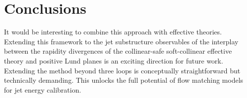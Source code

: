 \section{Conclusions}\label{sec:conclusions}

It would be interesting to combine this approach with effective
theories. Extending this framework to the jet substructure observables
of the interplay between the rapidity divergences of the collinear-safe
soft-collinear effective theory and positive Lund planes is an exciting
direction for future work. Extending the method beyond three loops is
conceptually straightforward but technically demanding. This unlocks the
full potential of flow matching models for jet energy calibration.

